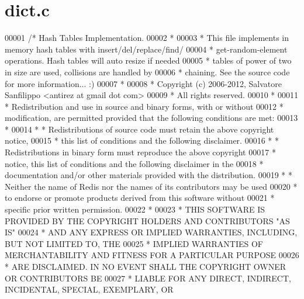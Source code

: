 \hypertarget{dict_8c_source}{}\section{dict.\+c}
\label{dict_8c_source}

\begin{DoxyCode}
00001 \textcolor{comment}{/* Hash Tables Implementation.}
00002 \textcolor{comment}{ *}
00003 \textcolor{comment}{ * This file implements in memory hash tables with insert/del/replace/find/}
00004 \textcolor{comment}{ * get-random-element operations. Hash tables will auto resize if needed}
00005 \textcolor{comment}{ * tables of power of two in size are used, collisions are handled by}
00006 \textcolor{comment}{ * chaining. See the source code for more information... :)}
00007 \textcolor{comment}{ *}
00008 \textcolor{comment}{ * Copyright (c) 2006-2012, Salvatore Sanfilippo <antirez at gmail dot com>}
00009 \textcolor{comment}{ * All rights reserved.}
00010 \textcolor{comment}{ *}
00011 \textcolor{comment}{ * Redistribution and use in source and binary forms, with or without}
00012 \textcolor{comment}{ * modification, are permitted provided that the following conditions are met:}
00013 \textcolor{comment}{ *}
00014 \textcolor{comment}{ *   * Redistributions of source code must retain the above copyright notice,}
00015 \textcolor{comment}{ *     this list of conditions and the following disclaimer.}
00016 \textcolor{comment}{ *   * Redistributions in binary form must reproduce the above copyright}
00017 \textcolor{comment}{ *     notice, this list of conditions and the following disclaimer in the}
00018 \textcolor{comment}{ *     documentation and/or other materials provided with the distribution.}
00019 \textcolor{comment}{ *   * Neither the name of Redis nor the names of its contributors may be used}
00020 \textcolor{comment}{ *     to endorse or promote products derived from this software without}
00021 \textcolor{comment}{ *     specific prior written permission.}
00022 \textcolor{comment}{ *}
00023 \textcolor{comment}{ * THIS SOFTWARE IS PROVIDED BY THE COPYRIGHT HOLDERS AND CONTRIBUTORS "AS IS"}
00024 \textcolor{comment}{ * AND ANY EXPRESS OR IMPLIED WARRANTIES, INCLUDING, BUT NOT LIMITED TO, THE}
00025 \textcolor{comment}{ * IMPLIED WARRANTIES OF MERCHANTABILITY AND FITNESS FOR A PARTICULAR PURPOSE}
00026 \textcolor{comment}{ * ARE DISCLAIMED. IN NO EVENT SHALL THE COPYRIGHT OWNER OR CONTRIBUTORS BE}
00027 \textcolor{comment}{ * LIABLE FOR ANY DIRECT, INDIRECT, INCIDENTAL, SPECIAL, EXEMPLARY, OR}

\end{DoxyCode}
